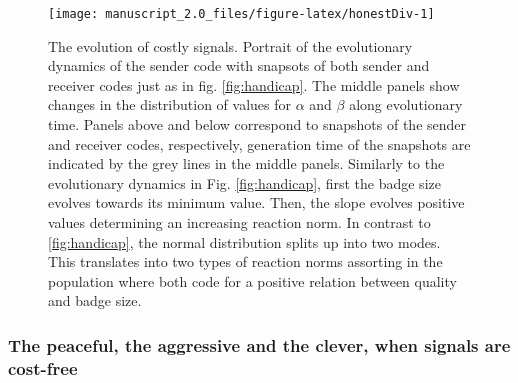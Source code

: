 \documentclass[
  12pt,
]{article}
\begin{document}
\begin{figure}

{\centering \texttt{[image: manuscript\_2.0\_files/figure-latex/honestDiv-1]} 

}

\caption{The evolution of costly signals. Portrait of the evolutionary dynamics of the sender code with snapsots of both sender and receiver codes just as in fig. \ref{fig:handicap}. The middle panels show changes in the distribution of values for $\alpha$ and $\beta$ along evolutionary time. Panels above and below correspond to snapshots of the sender and receiver codes, respectively, generation time of the snapshots are indicated by the grey lines in the middle panels. Similarly to the evolutionary dynamics in Fig. \ref{fig:handicap}, first the badge size evolves towards its minimum value. Then, the slope evolves positive values determining an increasing reaction norm. In contrast to \ref{fig:handicap}, the normal distribution splits up into two modes. This translates into two types of reaction norms assorting in the population where both code for a positive relation between quality and badge size.}\label{fig:honestDiv}
\end{figure}

\hypertarget{the-peaceful-the-aggressive-and-the-clever-when-signals-are-cost-free}{%
\subsubsection{The peaceful, the aggressive and the clever, when signals
are
cost-free}\label{the-peaceful-the-aggressive-and-the-clever-when-signals-are-cost-free}}
\end{document}
